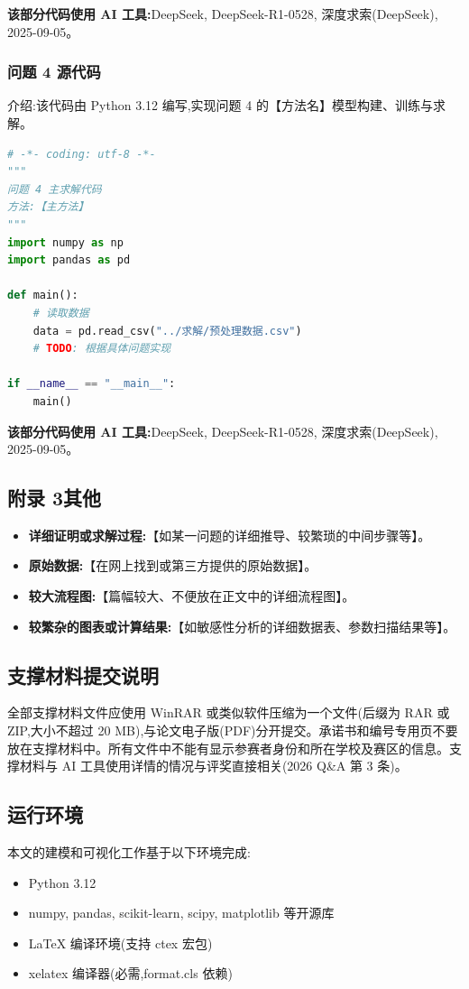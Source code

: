 \noindent\textbf{该部分代码使用 AI 工具:}DeepSeek, DeepSeek-R1-0528, 深度求索(DeepSeek), 2025-09-05。

\subsubsection*{问题 4 源代码}

介绍:该代码由 Python 3.12 编写,实现问题 4 的【方法名】模型构建、训练与求解。

\begin{lstlisting}[language=Python,caption={问题 4 主求解代码}]
# -*- coding: utf-8 -*-
"""
问题 4 主求解代码
方法:【主方法】
"""
import numpy as np
import pandas as pd

def main():
    # 读取数据
    data = pd.read_csv("../求解/预处理数据.csv")
    # TODO: 根据具体问题实现

if __name__ == "__main__":
    main()
\end{lstlisting}

\noindent\textbf{该部分代码使用 AI 工具:}DeepSeek, DeepSeek-R1-0528, 深度求索(DeepSeek), 2025-09-05。

\subsection*{附录 3\quad 其他}


\begin{itemize}[itemindent=2em]
  \item \textbf{详细证明或求解过程:}【如某一问题的详细推导、较繁琐的中间步骤等】。
  \item \textbf{原始数据:}【在网上找到或第三方提供的原始数据】。
  \item \textbf{较大流程图:}【篇幅较大、不便放在正文中的详细流程图】。
  \item \textbf{较繁杂的图表或计算结果:}【如敏感性分析的详细数据表、参数扫描结果等】。
\end{itemize}

\subsection*{支撑材料提交说明}

全部支撑材料文件应使用 WinRAR 或类似软件压缩为一个文件(后缀为 RAR 或 ZIP,大小不超过 20 MB),与论文电子版(PDF)分开提交。承诺书和编号专用页不要放在支撑材料中。所有文件中不能有显示参赛者身份和所在学校及赛区的信息。支撑材料与 AI 工具使用详情的情况与评奖直接相关(2026 Q\&A 第 3 条)。

\subsection*{运行环境}

本文的建模和可视化工作基于以下环境完成:

\begin{itemize}[itemindent=2em]
  \item Python 3.12
  \item numpy, pandas, scikit-learn, scipy, matplotlib 等开源库
  \item LaTeX 编译环境(支持 ctex 宏包)
  \item xelatex 编译器(必需,format.cls 依赖)
\end{itemize}
